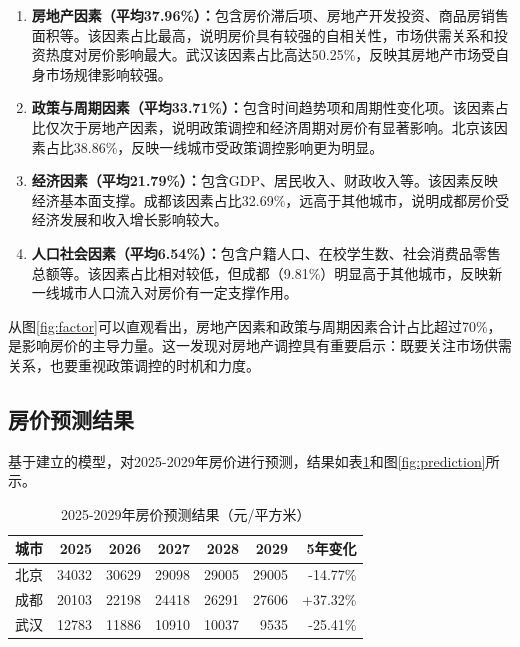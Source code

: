 \documentclass[12pt,a4paper]{article}
\begin{document}
\begin{enumerate}
    \item \textbf{房地产因素（平均37.96\%）：}包含房价滞后项、房地产开发投资、商品房销售面积等。该因素占比最高，说明房价具有较强的自相关性，市场供需关系和投资热度对房价影响最大。武汉该因素占比高达50.25\%，反映其房地产市场受自身市场规律影响较强。
    
    \item \textbf{政策与周期因素（平均33.71\%）：}包含时间趋势项和周期性变化项。该因素占比仅次于房地产因素，说明政策调控和经济周期对房价有显著影响。北京该因素占比38.86\%，反映一线城市受政策调控影响更为明显。
    
    \item \textbf{经济因素（平均21.79\%）：}包含GDP、居民收入、财政收入等。该因素反映经济基本面支撑。成都该因素占比32.69\%，远高于其他城市，说明成都房价受经济发展和收入增长影响较大。
    
    \item \textbf{人口社会因素（平均6.54\%）：}包含户籍人口、在校学生数、社会消费品零售总额等。该因素占比相对较低，但成都（9.81\%）明显高于其他城市，反映新一线城市人口流入对房价有一定支撑作用。
\end{enumerate}

从图\ref{fig:factor}可以直观看出，房地产因素和政策与周期因素合计占比超过70\%，是影响房价的主导力量。这一发现对房地产调控具有重要启示：既要关注市场供需关系，也要重视政策调控的时机和力度。

\subsection{房价预测结果}

基于建立的模型，对2025-2029年房价进行预测，结果如表\ref{tab:prediction}和图\ref{fig:prediction}所示。

\begin{table}[H]
\centering
\caption{2025-2029年房价预测结果（元/平方米）}
\label{tab:prediction}
\begin{tabular}{lrrrrrr}
\toprule
\textbf{城市} & \textbf{2025} & \textbf{2026} & \textbf{2027} & \textbf{2028} & \textbf{2029} & \textbf{5年变化} \\
\midrule
北京 & 34032 & 30629 & 29098 & 29005 & 29005 & -14.77\% \\
成都 & 20103 & 22198 & 24418 & 26291 & 27606 & +37.32\% \\
武汉 & 12783 & 11886 & 10910 & 10037 & 9535 & -25.41\% \\
\bottomrule
\end{tabular}
\end{table}
\end{document}

